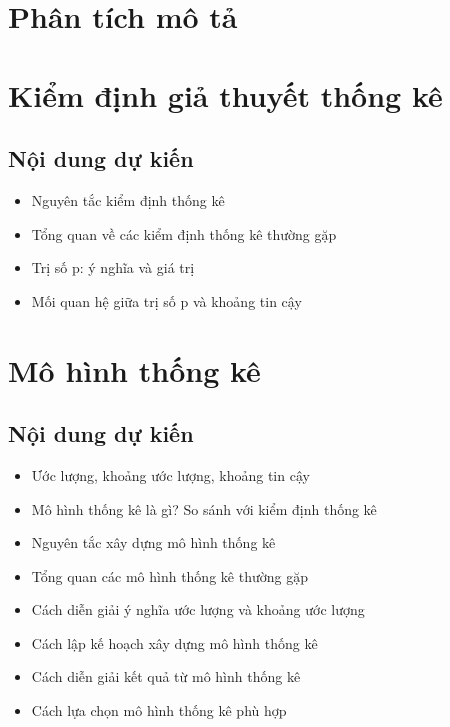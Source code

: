 \documentclass[]{tufte-book}
\providecommand{\tightlist}{%
  \setlength{\itemsep}{0pt}\setlength{\parskip}{0pt}}
\begin{document}
\hypertarget{phan-tich-mo-ta}{%
\chapter{Phân tích mô tả}\label{phan-tich-mo-ta}}

\hypertarget{kim-inh-gia-thuyt-thng-ke}{%
\chapter{Kiểm định giả thuyết thống kê}\label{kim-inh-gia-thuyt-thng-ke}}

\hypertarget{ni-dung-d-kin-1}{%
\section{Nội dung dự kiến}\label{ni-dung-d-kin-1}}

\begin{itemize}
\tightlist
\item
  Nguyên tắc kiểm định thống kê
\item
  Tổng quan về các kiểm định thống kê thường gặp
\item
  Trị số p: ý nghĩa và giá trị
\item
  Mối quan hệ giữa trị số p và khoảng tin cậy
\end{itemize}

\hypertarget{mo-hinh-thng-ke}{%
\chapter{Mô hình thống kê}\label{mo-hinh-thng-ke}}

\hypertarget{ni-dung-d-kin-2}{%
\section{Nội dung dự kiến}\label{ni-dung-d-kin-2}}

\begin{itemize}
\item
  Ước lượng, khoảng ước lượng, khoảng tin cậy
\item
  Mô hình thống kê là gì? So sánh với kiểm định thống kê
\item
  Nguyên tắc xây dựng mô hình thống kê
\item
  Tổng quan các mô hình thống kê thường gặp
\item
  Cách diễn giải ý nghĩa ước lượng và khoảng ước lượng
\item
  Cách lập kế hoạch xây dựng mô hình thống kê
\item
  Cách diễn giải kết quả từ mô hình thống kê
\item
  Cách lựa chọn mô hình thống kê phù hợp
\end{itemize}
\end{document}
